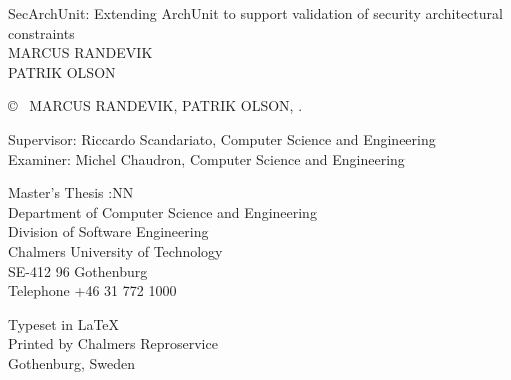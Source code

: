 \newpage
\thispagestyle{plain}
\vspace*{4.5cm}
SecArchUnit: Extending ArchUnit to support validation of security architectural constraints\\
MARCUS RANDEVIK\\
PATRIK OLSON \setlength{\parskip}{1cm}

\copyright ~ MARCUS RANDEVIK, PATRIK OLSON, \the\year. \setlength{\parskip}{1cm}

Supervisor: Riccardo Scandariato, Computer Science and Engineering\\
Examiner: Michel Chaudron, Computer Science and Engineering \setlength{\parskip}{1cm}

Master's Thesis \the\year:NN\\	%
Department of Computer Science and Engineering\\
Division of Software Engineering\\
Chalmers University of Technology\\
SE-412 96 Gothenburg\\
Telephone +46 31 772 1000 \setlength{\parskip}{0.5cm}

\vfill

Typeset in \LaTeX \tagtemp\\
Printed by Chalmers Reproservice\\
Gothenburg, Sweden \the\year

